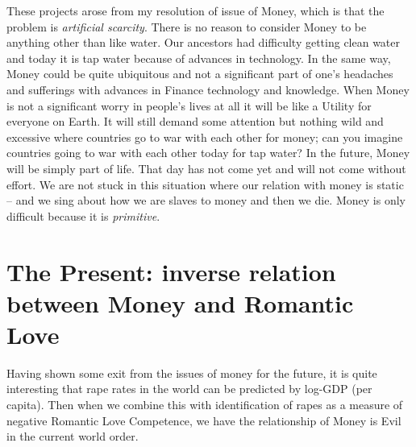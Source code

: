 \documentclass{amsart}
\begin{document}
These projects arose from my resolution of issue of Money, which is that the problem is {\em artificial scarcity}.  There is no reason to consider Money to be anything other than like water.  Our ancestors had difficulty getting clean water and today it is tap water because of advances in technology.  In the same way, Money could be quite ubiquitous and not a significant part of one's headaches and sufferings with advances in Finance technology and knowledge.  When Money is not a significant worry in people's lives at all it will be like a Utility for everyone on Earth.  It will still demand some attention but nothing wild and excessive where countries go to war with each other for money; can you imagine countries going to war with each other today for tap water?  In the future, Money will be simply part of life.  That day has not come yet and will not come without effort.  We are not stuck in this situation where our relation with money is static -- and we sing about how we are slaves to money and then we die.  Money is only difficult because it is {\em primitive}.

\section{The Present: inverse relation between Money and Romantic Love}
Having shown some exit from the issues of money for the future, it is quite interesting that rape rates in the world can be predicted by log-GDP (per capita).  Then when we combine this with identification of rapes as a measure of negative Romantic Love Competence, we have the relationship of Money is Evil in the current world order.
\end{document}
